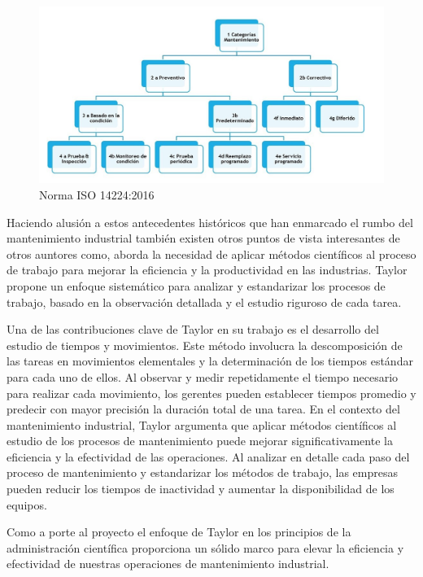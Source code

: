 \documentclass[
  11pt,
  bookmarksnumbered]{article}
\begin{document}
\begin{figure}

{\centering \includegraphics[width=5.37in]{Imagenes/categorias} 

}

\caption{Norma ISO 14224:2016}\label{fig:unnamed-chunk-2}
\end{figure}

Haciendo alusión a estos antecedentes históricos que han enmarcado el rumbo del mantenimiento industrial también existen otros puntos de vista interesantes de otros auntores como, \textcite{taylor1911principles} aborda la necesidad de aplicar métodos científicos al proceso de trabajo para mejorar la eficiencia y la productividad en las industrias.
Taylor propone un enfoque sistemático para analizar y estandarizar los procesos de trabajo, basado en la observación detallada y el estudio riguroso de cada tarea.

Una de las contribuciones clave de Taylor en su trabajo es el desarrollo del estudio de tiempos y movimientos.
Este método involucra la descomposición de las tareas en movimientos elementales y la determinación de los tiempos estándar para cada uno de ellos.
Al observar y medir repetidamente el tiempo necesario para realizar cada movimiento, los gerentes pueden establecer tiempos promedio y predecir con mayor precisión la duración total de una tarea.
En el contexto del mantenimiento industrial, Taylor argumenta que aplicar métodos científicos al estudio de los procesos de mantenimiento puede mejorar significativamente la eficiencia y la efectividad de las operaciones.
Al analizar en detalle cada paso del proceso de mantenimiento y estandarizar los métodos de trabajo, las empresas pueden reducir los tiempos de inactividad y aumentar la disponibilidad de los equipos.

Como a porte al proyecto el enfoque de Taylor en los principios de la administración científica proporciona un sólido marco para elevar la eficiencia y efectividad de nuestras operaciones de mantenimiento industrial.
\end{document}
